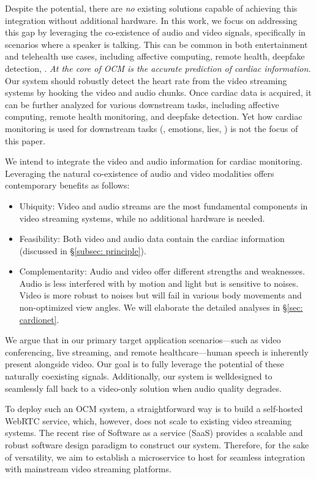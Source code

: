 Despite the potential, there are \textit{no} existing solutions capable of achieving this integration without additional hardware. 
In this work, we focus on addressing this gap by leveraging the co-existence of audio and video signals, specifically in scenarios where a speaker is talking. This can be common in both entertainment and telehealth use cases, including affective computing, remote health, deepfake detection, \etc. \textit{At the core of OCM is the accurate prediction of cardiac information.} Our system should robustly detect the heart rate from the video streaming systems by hooking the video and audio chunks. {Once cardiac data is acquired, it can be further analyzed for various downstream tasks, including affective computing, remote health monitoring, and deepfake detection.} Yet how cardiac monitoring is used for downstream tasks (\eg, emotions, lies, \etc) is not the focus of this paper. 

 We intend to integrate the video and audio information for cardiac monitoring. Leveraging the natural co-existence of audio and video modalities offers contemporary benefits as follows: 
\begin{itemize}
    \item Ubiquity: Video and audio streams are the most fundamental components in video streaming systems, while no additional hardware is needed.
    \item  Feasibility: Both video and audio data contain the cardiac information (discussed in \S\ref{subsec: principle}).
    \item  Complementarity: Audio and video offer different strengths and weaknesses. Audio is less interfered with by motion and light but is sensitive to noises. Video is more robust to noises but will fail in various body movements and non-optimized view angles. We will elaborate the detailed analyses in \S\ref{sec: cardionet}.
\end{itemize}
We argue that in our primary target application scenarios—such as video conferencing, live streaming, and remote healthcare—human speech is inherently present alongside video. Our goal is to fully leverage the potential of these naturally coexisting signals. Additionally, our system is welldesigned to seamlessly fall back to a video-only solution when audio quality degrades.

To deploy such an OCM system, a straightforward way is to build a self-hosted WebRTC service, which, however, does not scale to existing video streaming systems. 
The recent rise of Software as a service (SaaS) provides a scalable and robust software design paradigm to construct our system. 
Therefore, for the sake of versatility, we aim to establish a microservice to host \sysname for seamless integration with mainstream video streaming platforms.

